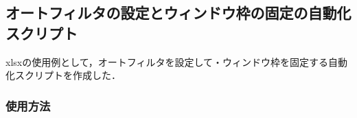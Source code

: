 \documentclass[
]{article}
\begin{document}
\hypertarget{ux30aaux30fcux30c8ux30d5ux30a3ux30ebux30bfux306eux8a2dux5b9aux3068ux30a6ux30a3ux30f3ux30c9ux30a6ux67a0ux306eux56faux5b9aux306eux81eaux52d5ux5316ux30b9ux30afux30eaux30d7ux30c8}{%
\subsection{オートフィルタの設定とウィンドウ枠の固定の自動化スクリプト}\label{ux30aaux30fcux30c8ux30d5ux30a3ux30ebux30bfux306eux8a2dux5b9aux3068ux30a6ux30a3ux30f3ux30c9ux30a6ux67a0ux306eux56faux5b9aux306eux81eaux52d5ux5316ux30b9ux30afux30eaux30d7ux30c8}}

xlsxの使用例として，オートフィルタを設定して・ウィンドウ枠を固定する自動化スクリプトを作成した．

\hypertarget{ux4f7fux7528ux65b9ux6cd5}{%
\subsubsection{使用方法}\label{ux4f7fux7528ux65b9ux6cd5}}
\end{document}
